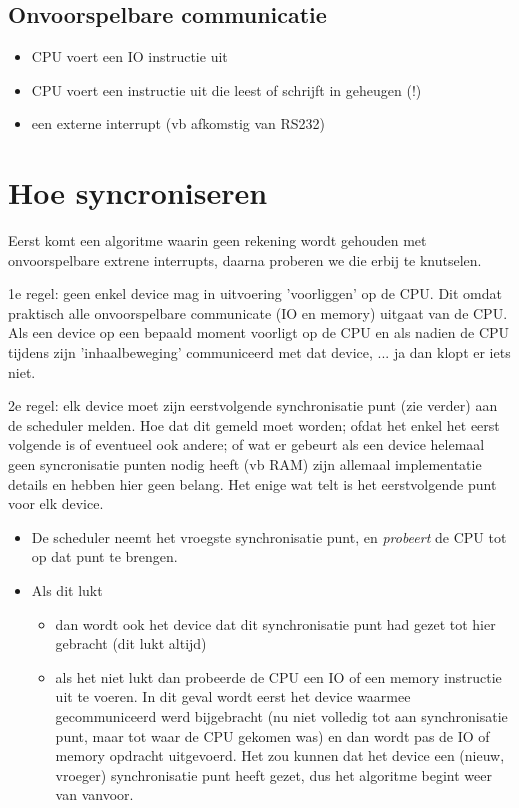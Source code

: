 \documentclass[11pt, a4paper]{report}
\begin{document}
   
\subsection{Onvoorspelbare communicatie}

\begin{itemize}
\item CPU voert een IO instructie uit
\item CPU voert een instructie uit die leest of schrijft in geheugen (!)
\item een externe interrupt (vb afkomstig van RS232)
\end{itemize}


\section{Hoe syncroniseren}

Eerst komt een algoritme waarin geen rekening wordt gehouden met onvoorspelbare
extrene interrupts, daarna proberen we die erbij te knutselen.

1e regel: geen enkel device mag in uitvoering 'voorliggen' op de CPU.
  Dit omdat praktisch alle onvoorspelbare communicate (IO en memory) uitgaat
  van de CPU. Als een device op een bepaald moment voorligt op de CPU en als 
  nadien de CPU tijdens zijn 'inhaalbeweging' communiceerd met dat device, ...
  ja dan klopt er iets niet.

2e regel: elk device moet zijn eerstvolgende synchronisatie punt (zie verder)
  aan de scheduler melden. Hoe dat dit gemeld moet worden; ofdat het enkel het
  eerst volgende is of eventueel ook andere; of wat er gebeurt als een device
  helemaal geen syncronisatie punten nodig heeft (vb RAM) zijn allemaal 
  implementatie details en hebben hier geen belang. Het enige wat telt is het
  eerstvolgende punt voor elk device.

\begin{itemize}
\item De scheduler neemt het vroegste synchronisatie punt, en \textit{probeert}
de CPU tot op dat punt te brengen.
\item Als dit lukt
	\begin{itemize}
	\item dan wordt ook het device dat dit synchronisatie punt had gezet tot
	hier gebracht (dit lukt altijd)
	\item als het niet lukt dan probeerde de CPU een IO of een memory instructie
	uit te voeren. In dit geval wordt eerst het device waarmee gecommuniceerd
	werd bijgebracht (nu niet volledig tot aan synchronisatie punt, maar tot
	waar de CPU gekomen was) en dan wordt pas de IO of memory opdracht 
	uitgevoerd. Het zou kunnen dat het device een (nieuw, vroeger) 
	synchronisatie punt heeft gezet, dus het algoritme begint weer van 
	vanvoor.
	\end{itemize}
\end{itemize}
       
\end{document}
